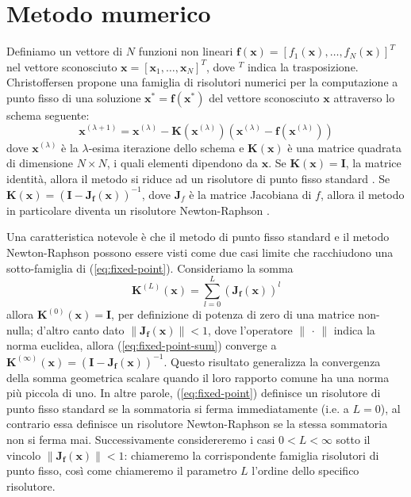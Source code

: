 \chapter{Metodo mumerico}
	\label{sec:metodo_numerico}
	Definiamo un vettore di $N$ funzioni non lineari $\mathbf{f(x)} = [f_{1}(\mathbf{x}), \dots , f_{N}(\mathbf{x})]^{T}$ nel vettore sconosciuto $\mathbf{x} = [\mathbf{x}_{1}, \dots , \mathbf{x}_{N}]^{T}$, dove $^T$ indica la trasposizione. Christoffersen \cite{christoffersen} propone una famiglia di risolutori numerici per la computazione a punto fisso di una soluzione $\mathbf{x}^{*} = \mathbf{f(x^{*})}$ del vettore sconosciuto $\mathbf{x}$ attraverso lo schema seguente:
	\begin{equation}
		\label{eq:fixed-point}
		\mathbf{x}^{(\lambda+1)} = \mathbf{x}^{(\lambda)}-\mathbf{K}(\mathbf{x}^{(\lambda)})(\mathbf{x}^{(\lambda)}-\mathbf{f}(\mathbf{x}^{(\lambda)}))
	\end{equation}
	dove $\mathbf{x}^{(\lambda)}$ è la $\lambda$-esima iterazione dello schema e $\mathbf{K(x)}$ è una matrice quadrata di dimensione $N \times N$, i quali elementi dipendono da $\mathbf{x}$. Se $\mathbf{K}(\mathbf{x}) = \mathbf{I}$, la matrice identità, allora il metodo si riduce ad un risolutore di punto fisso standard \cite{atkinson}. Se $\mathbf{K}(\mathbf{x}) = (\mathbf{I}-\mathbf{J_{f}(x)})^{-1}$, dove $\mathbf{J}_{f}$ è la matrice Jacobiana di $f$, allora il metodo in particolare diventa un risolutore Newton-Raphson \cite{atkinson}.
		
	Una caratteristica notevole è che il metodo di punto fisso standard e il metodo Newton-Raphson possono essere visti come due casi limite che racchiudono una sotto-famiglia di (\ref{eq:fixed-point}). Consideriamo la somma
	\begin{equation}
		\label{eq:fixed-point-sum}
		\mathbf{K}^{(L)}(\mathbf{x}) = \sum_{l=0}^{L} \left(\mathbf{J_{f}(x)}\right)^{l}
	\end{equation}
	allora $\mathbf{K}^{(0)}(\mathbf{x}) = \mathbf{I}$, per definizione di potenza di zero di una matrice non-nulla; d'altro canto dato $\lVert\mathbf{J_{f}(x)}\rVert < 1$, dove l'operatore $\lVert\,\cdot\,\rVert$ indica la norma euclidea, allora (\ref{eq:fixed-point-sum}) converge a $\mathbf{K}^{(\infty)}(\mathbf{x}) = (\mathbf{I}-\mathbf{J_{f}(x)})^{-1}$. Questo risultato generalizza la convergenza della somma geometrica scalare quando il loro rapporto comune ha una norma più piccola di uno. In altre parole, (\ref{eq:fixed-point}) definisce un risolutore di punto fisso standard se la sommatoria si ferma immediatamente (i.e. a $L = 0$), al contrario essa definisce un risolutore Newton-Raphson se la stessa sommatoria non si ferma mai. Successivamente considereremo i casi $0 < L < \infty$ sotto il vincolo $\lVert\mathbf{J_{f}(x)}\rVert < 1$: chiameremo la corrispondente famiglia risolutori di punto fisso, così come chiameremo il parametro $L$ l'ordine dello specifico risolutore.